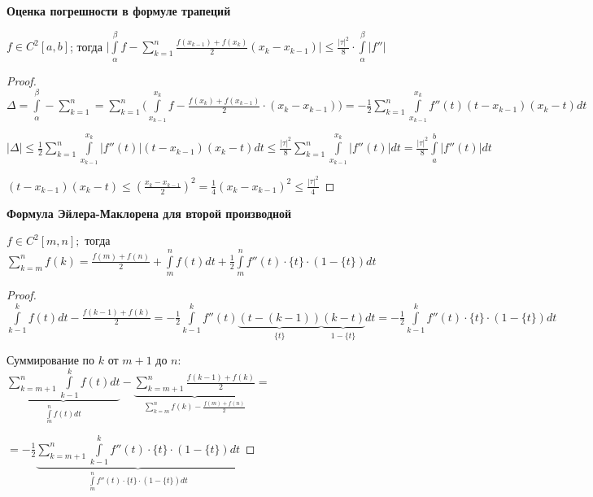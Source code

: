 \begin{theorem}
    \textbf{Оценка погрешности в формуле трапеций}

    $f\in C^2[a,b]$; тогда $\bigg|\int\limits_\alpha^\beta f-\sum\limits_{k=1}^n\frac{f(x_{k-1})+f(x_k)}{2}(x_k-x_{k-1})\bigg|\leq \frac{|\tau|^2}{8}\cdot \int\limits_\alpha^\beta|f''|$
\end{theorem}

\begin{proof}
    $\Delta =\int\limits_\alpha^\beta -\sum\limits_{k=1}^n
    =\sum\limits_{k=1}^n\bigg(\int\limits_{x_{k-1}}^{x_k} f - \frac{f(x_k)+f(x_{k-1})}{2}\cdot(x_k-x_{k-1})\bigg)
    =-\frac{1}{2}\sum\limits_{k=1}^n \int\limits_{x_{k-1}}^{x_k} f'' (t)(t-x_{k-1})(x_k-t)dt$

    $|\Delta|\leq \frac{1}{2}\sum\limits_{k=1}^n \int\limits_{x_{k-1}}^{x_k} |f'' (t)|(t-x_{k-1})(x_k-t)dt\leq \frac{|\tau|^2}{8}\sum\limits_{k=1}^n\int\limits_{x_{k-1}}^{x_k} |f''(t)|dt=\frac{|\tau|^2}{8}\int\limits_{a}^{b} |f''(t)|dt$

    $(t-x_{k-1})(x_k-t)\leq (\frac{x_k-x_{k-1}}{2})^2=\frac{1}{4}(x_k-x_{k-1})^2\leq \frac{|\tau|^2}{4}$
\end{proof}

\begin{theorem}
    \textbf{Формула Эйлера-Маклорена для второй производной}

    $f\in C^2[m,n];$ тогда $\sum\limits_{k=m}^n f(k)=\frac{f(m)+f(n)}{2}+\int\limits_m^n f(t)dt+\frac{1}{2}\int\limits_m^nf''(t)\cdot \{t\}\cdot(1-\{t\})dt$
\end{theorem}

\begin{proof}
    $\int\limits_{k-1}^k f(t)dt-\frac{f(k-1)+f(k)}{2}
    =-\frac{1}{2}\int\limits_{k-1}^k f''(t)\underbrace{(t-(k-1))}_{\{t\}}\underbrace{(k-t)}_{1-\{t\}}dt
    =-\frac{1}{2}\int\limits_{k-1}^k f''(t)\cdot\{t\}\cdot(1-\{t\})dt$

    Суммирование по $k$ от $m+1$ до $n$: $\underbrace{\sum\limits_{k=m+1}^n\int\limits_{k-1}^k f(t)dt}_{\int\limits_m^n f(t)dt}-\underbrace{\sum\limits_{k=m+1}^n\frac{f(k-1)+f(k)}{2}}_{\sum\limits_{k=m}^nf(k)-\frac{f(m)+f(n)}{2}}=$
    
    $=-\frac{1}{2}\underbrace{\sum\limits_{k=m+1}^n\int\limits_{k-1}^k f''(t)\cdot\{t\}\cdot(1-\{t\})dt}_{\int\limits_{m}^n f''(t)\cdot\{t\}\cdot(1-\{t\})dt}$
\end{proof}

